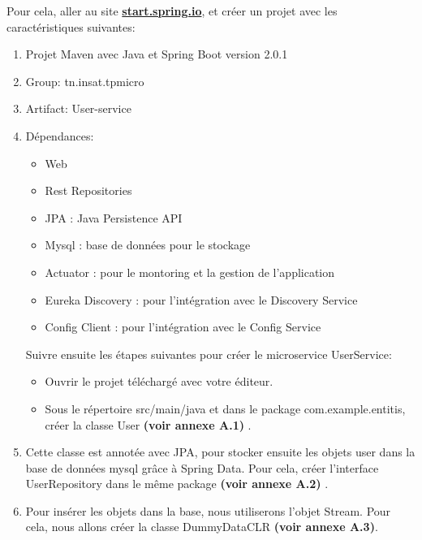 Pour cela, aller au site \underline{\textbf{start.spring.io}}, et créer un projet avec les caractéristiques suivantes:

\begin{enumerate}
       	\item  Projet Maven avec Java et Spring Boot version 2.0.1
		\item  Group: tn.insat.tpmicro
		\item  Artifact: User-service
		\item  Dépendances:
		
		\begin{itemize}
		  \item Web
		  \item Rest Repositories
		  \item JPA : Java Persistence API
		 \item Mysql : base de données pour le stockage
		 \item Actuator : pour le montoring et la gestion de l'application
		 \item  Eureka Discovery : pour l'intégration avec le Discovery Service
		 \item  Config Client : pour l'intégration avec le Config Service
		\end{itemize}
		



Suivre ensuite les étapes suivantes pour créer le microservice UserService:

\begin{itemize}
\item Ouvrir le projet téléchargé avec votre éditeur. 

\item Sous le répertoire src/main/java et dans le package com.example.entitis, créer la classe User  \textbf{(voir annexe A.1) }.
\end{itemize}



\item Cette classe est annotée avec JPA, pour stocker ensuite les objets user dans la base de données mysql grâce à Spring Data. Pour cela, créer l'interface UserRepository dans le même package  \textbf{(voir annexe A.2) }. 




\item Pour insérer les objets dans la base, nous utiliserons l'objet Stream. Pour cela, nous allons créer la classe DummyDataCLR \textbf{(voir annexe A.3)}.




\end{enumerate}

